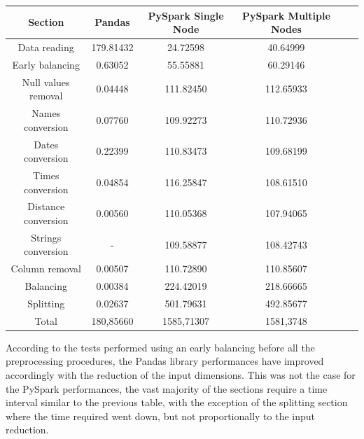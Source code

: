 \documentclass[
	letterpaper, %
	10pt, %
]{class}
\begin{document}
\begin{center}
    \begin{tabular}{ |c|c|c|c|c|c| }
        \hline
        Section             & Pandas    & PySpark Single Node & PySpark Multiple Nodes \\
        \hline
        Data reading        & 179.81432 & 24.72598            & 40.64999               \\
        Early balancing     & 0.63052   & 55.55881            & 60.29146               \\
        Null values removal & 0.04448   & 111.82450           & 112.65933              \\
        Names conversion    & 0.07760   & 109.92273           & 110.72936              \\
        Dates conversion    & 0.22399   & 110.83473           & 109.68199              \\
        Times conversion    & 0.04854   & 116.25847           & 108.61510              \\
        Distance conversion & 0.00560   & 110.05368           & 107.94065              \\
        Strings conversion  & -         & 109.58877           & 108.42743              \\
        Column removal      & 0.00507   & 110.72890           & 110.85607              \\
        Balancing           & 0.00384   & 224.42019           & 218.66665              \\
        Splitting           & 0.02637   & 501.79631           & 492.85677              \\
        Total               & 180,85660 & 1585,71307          & 1581,3748              \\
        \hline
    \end{tabular}
\end{center}

According to the tests performed using an early balancing before all the preprocessing procedures, the Pandas library performances have improved accordingly with the reduction of the input dimensions.
This was not the case for the PySpark performances, the vast majority of the sections require a time interval similar to the previous table, with the exception of the splitting section where the time required went down, but not proportionally to the input reduction.\\
\end{document}
